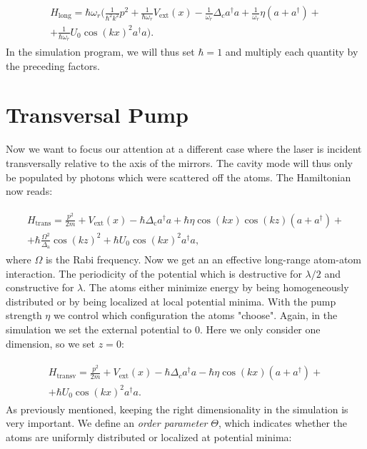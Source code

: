 \begin{align}
\begin{split}
H_\text{long} = \hbar \omega_r \biggl( \frac{1}{\hbar^2 k^2} p^2 + \frac{1}{\hbar \omega_r} V_\text{ext}(x) - \frac{1}{\omega_r} \Delta_c a^\dagger a + \frac{1}{\omega_r} \eta (a + a^\dagger) + \\
 + \frac{1}{\hbar \omega_r} U_0 \cos(kx)^2 a^\dagger a \biggr).
\end{split}
\end{align}In the simulation program, we will thus set $\hbar = 1$ and multiply each quantity by the preceding factors.

\section{Transversal Pump}

Now we want to focus our attention at a different case where the laser is incident transversally relative to the axis of the mirrors. The cavity mode will thus only be populated by photons which were scattered off the atoms. The Hamiltonian now reads:

\begin{align}
\begin{split}
H_\text{trans} = \frac{p^2}{2m} + V_\text{ext}(x) - \hbar \Delta_\text{c} a^\dagger a  + \hbar \eta \cos(kx) \cos(kz) (a + a^\dagger) + \\
+ \hbar \frac{\Omega^2}{\Delta_\text{a}} \cos(kz)^2 + \hbar U_0 \cos(kx)^2 a^\dagger a,
\end{split}
\end{align}where $\Omega$ is the Rabi frequency. Now we get an an effective long-range atom-atom interaction. The periodicity of the potential which is destructive for $\lambda / 2$ and constructive for $\lambda$. The atoms either minimize energy by being homogeneously distributed or by being localized at local potential minima. With the pump strength $\eta$ we control which configuration the atoms "choose". Again, in the simulation we set the external potential to 0. Here we only consider one dimension, so we set $z=0$:

\begin{align}
\begin{split}
H_\text{transv} = \frac{p^2}{2m} + V_\text{ext}(x) - \hbar \Delta_c a^\dagger a - \hbar \eta \cos(kx) (a + a^\dagger) + \\
 + \hbar U_0 \cos(kx)^2 a^\dagger a.
\end{split}
\end{align}As previously mentioned, keeping the right dimensionality in the simulation is very important. We define an \textit{order parameter} $\Theta$, which indicates whether the atoms are uniformly distributed or localized at potential minima:

